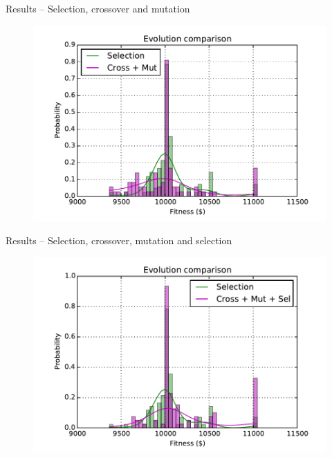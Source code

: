 \documentclass[12pt,portuguese]{beamer}
\begin{document}
\begin{frame}{Results -- Selection, crossover and mutation}
	\begin{figure}[h]
	\centering
	\includegraphics[width=0.9\columnwidth]{images/sel_x_cross_mut.pdf}
	\end{figure}
\end{frame}

\begin{frame}{Results -- Selection, crossover, mutation and selection}
	\begin{figure}[h]
	\centering
	\includegraphics[width=0.9\columnwidth]{images/01r_100_cr_mut_sel.pdf}
	\end{figure}
\end{frame}
\end{document}
